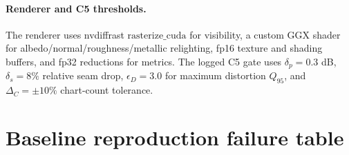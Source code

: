 \paragraph*{Renderer and C5 thresholds.}
The renderer uses nvdiffrast \(\mathrm{rasterize\_cuda}\) for visibility, a custom GGX shader for albedo/normal/roughness/metallic relighting, fp16 texture and shading buffers, and fp32 reductions for metrics. The logged C5 gate uses \(\delta_p=0.3\) dB, \(\delta_s=8\%\) relative seam drop, \(\epsilon_D=3.0\) for maximum distortion \(Q_{95}\), and \(\Delta_C=\pm10\%\) chart-count tolerance.

\section{Baseline reproduction failure table}
\label{app:baseline_failure}

